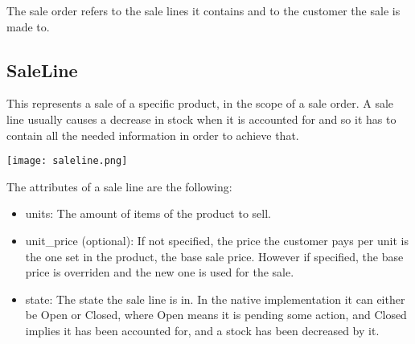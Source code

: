 The sale order refers to the sale lines it contains and to the customer the sale is made to.

\subsection{SaleLine}
This represents a sale of a specific product, in the scope of a sale order. A sale line usually causes a decrease in stock when it is accounted for and so it has to contain all the needed information in order to achieve that.
\begin{center}
\texttt{[image: saleline.png]}
\end{center}
The attributes of a sale line are the following:

\begin{itemize}
\item units: The amount of items of the product to sell.
\item unit\_price (optional): If not specified, the price the customer pays per unit is the one set in the product, the base sale price. However if specified, the base price is overriden and the new one is used for the sale.
\item state: The state the sale line is in. In the native implementation it can either be Open or Closed, where Open means it is pending some action, and Closed implies it has been accounted for, and a stock has been decreased by it.
\end{itemize}